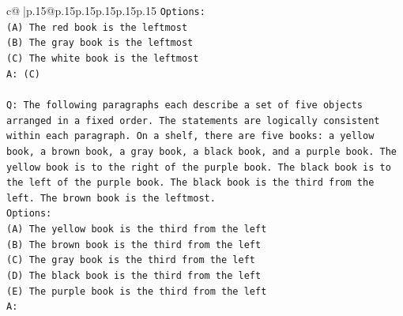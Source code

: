 \documentclass{article}
\begin{document}
{\begin{supertabular}{c@{$\;$}|p{.15\linewidth}@{}p{.15\linewidth}p{.15\linewidth}p{.15\linewidth}p{.15\linewidth}p{.15\linewidth}}
{{{\texttt{Options:} \\
\texttt{(A) The red book is the leftmost} \\
\texttt{(B) The gray book is the leftmost} \\
\texttt{(C) The white book is the leftmost} \\
\texttt{A: (C)} \\
\\ 
\texttt{Q: The following paragraphs each describe a set of five objects arranged in a fixed order. The statements are logically consistent within each paragraph. On a shelf, there are five books: a yellow book, a brown book, a gray book, a black book, and a purple book. The yellow book is to the right of the purple book. The black book is to the left of the purple book. The black book is the third from the left. The brown book is the leftmost.} \\
\texttt{Options:} \\
\texttt{(A) The yellow book is the third from the left} \\
\texttt{(B) The brown book is the third from the left} \\
\texttt{(C) The gray book is the third from the left} \\
\texttt{(D) The black book is the third from the left} \\
\texttt{(E) The purple book is the third from the left} \\
\texttt{A:} \\
            }
        }
    }
     \\ \\


\end{supertabular}}
\end{document}
